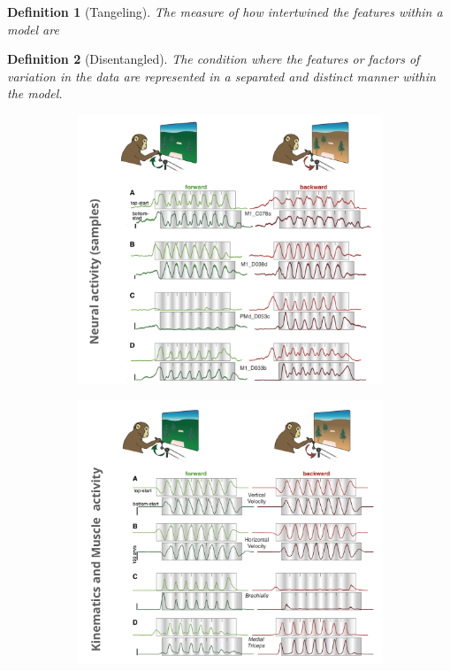 \documentclass[11pt]{book} %
\newtheorem{definition}{Definition}[section]
\begin{document}
\begin{definition}[Tangeling]
    The measure of how intertwined the features within a model are
\end{definition}

\begin{definition}[Disentangled]
    The condition where the features or factors of variation in the data are represented in a separated and distinct manner within the model.
\end{definition}

\begin{figure}[h]
    \begin{subfigure}[b]{0.5\textwidth}
        \centering
        \includegraphics[width=\textwidth]{./Figs/monkey1.jpeg}
        \label{fig:entanglement}
    \end{subfigure}
    \begin{subfigure}[b]{0.5\textwidth}
        \centering
        \includegraphics[width=\textwidth]{./Figs/monkey2.jpeg}

\end{subfigure}
\end{figure}
\end{document}
